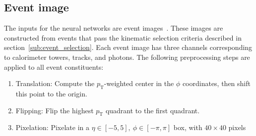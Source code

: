 \documentclass[12pt]{article}
\begin{document}
    \subsection{Event image}%
    \label{sub:event_image}
        The inputs for the neural networks are event images~\cite{Kasieczka:2019dbj,deOliveira:2015xxd, Kasieczka2017nv}. These images are constructed from events that pass the kinematic selection criteria described in section~\ref{sub:event_selection}. Each event image has three channels corresponding to calorimeter towers, tracks, and photons. The following preprocessing steps are applied to all event constituents:
        \begin{enumerate}
            \item Translation: Compute the $p_{\text{T}}$-weighted center in the $\phi$ coordinates, then shift this point to the origin.
            \item Flipping: Flip the highest $p_{\text{T}}$ quadrant to the first quadrant.
            \item Pixelation: Pixelate in a $\eta \in [-5, 5],\ \phi \in [-\pi, \pi]$ box, with $40 \times 40$ pixels 
        \end{enumerate}
\end{document}
